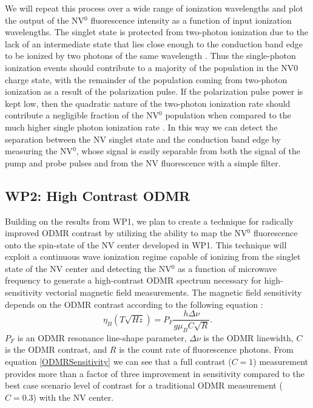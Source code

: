 We will repeat this process over a wide range of ionization wavelengths and plot the output of the NV$^0$
fluorescence intensity as a function of input ionization wavelengths.  The singlet state is protected
from two-photon ionization due to the lack of an intermediate state that lies close enough to the
conduction band edge to be ionized by two photons of the same wavelength \cite{Shields2015}.  Thus the
single-photon
ionization events should contribute to a majority of the population in the NV0 charge state, with the
remainder of the population coming from two-photon ionization as a result of the polarization pulse. 
If the polarization pulse power is kept low, then the quadratic nature of the two-photon ionization
rate should contribute a negligible fraction of the NV$^0$ population when compared to the much higher
single photon ionization rate \cite{Aslam2013}.  In this way we can detect the separation between the NV singlet
state and the conduction band edge by measuring the NV$^0$, whose signal is easily separable from both the
signal of the pump and probe pulses and from the NV fluorescence with a simple filter.

\subsection{WP2: High Contrast ODMR}
Building on the results from WP1, we plan to create a technique for radically improved ODMR contrast by
utilizing the ability to map the NV$^0$ fluorescence onto the spin-state of the NV center developed in
WP1.  This technique will exploit a continuous wave ionization regime capable of ionizing from the
singlet state of the NV center and detecting the NV$^0$ as a function of microwave frequency to generate a
high-contrast ODMR spectrum necessary for high-sensitivity vectorial magnetic field measurements.  The
magnetic field sensitivity depends on the ODMR contrast according to the following equation
\cite{Dreau2011}: 
\begin{equation}
\eta_{B} (T\sqrt{Hz}) = P_F\frac{h\Delta\nu}{g\mu_B C\sqrt{R}}.
\label{ODMRSensitivity}
\end{equation}
$P_F$ is an ODMR resonance line-shape parameter, $\Delta\nu$ is the ODMR linewidth,
$C$ is the ODMR contrast, and $R$ is the count rate of fluorescence photons.  From equation \ref{ODMRSensitivity} we can see
that a full contrast ($C=1$) measurement provides more than a factor of three improvement in sensitivity
compared to the best case scenario level of contrast for a traditional ODMR measurement ($C=0.3$) with
the NV center.

